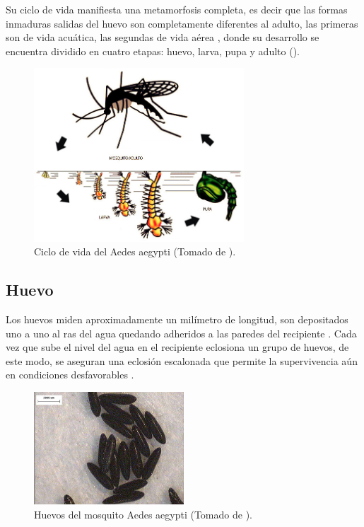 Su ciclo de vida manifiesta una metamorfosis completa, es decir que las formas inmaduras salidas
del huevo son completamente diferentes al adulto, las primeras son de vida acuática, las segundas
de vida aérea \cite{directricesDetvArg}, donde su desarrollo se encuentra dividido en cuatro
etapas: huevo, larva, pupa y adulto \cite{web-site:gMonteroBiologia}
().

\begin{figure}[!htbp]
\centering
\includegraphics[width=0.7\textwidth]{capitulo-3/graphics/ciclo-de-vida.png}
\caption{\label{fig:cap3-ciclo-de-vida} Ciclo de vida del Aedes aegypti (Tomado de
\cite{directricesDetvArg}).}
\end{figure}

\subsection{Huevo}
\label{subsec:ciclo-biologico-huevo}
Los huevos miden aproximadamente un milímetro de longitud, son depositados uno a uno al ras del agua quedando adheridos a las paredes del recipiente \cite{ThironIzcazaJ2003}. Cada vez que sube el
nivel del agua en el recipiente eclosiona un grupo de huevos, de este modo, se aseguran una
eclosión escalonada que permite la supervivencia aún en condiciones desfavorables
\cite{directricesDetvArg}.

\begin{figure}[!htbp]
\centering
\includegraphics[width=0.5\textwidth]{capitulo-3/graphics/huevos.png}
\caption{\label{fig:cap3-huevos} Huevos del mosquito Aedes aegypti (Tomado de
\cite{sivanathan2006ecology}).}
\end{figure}

